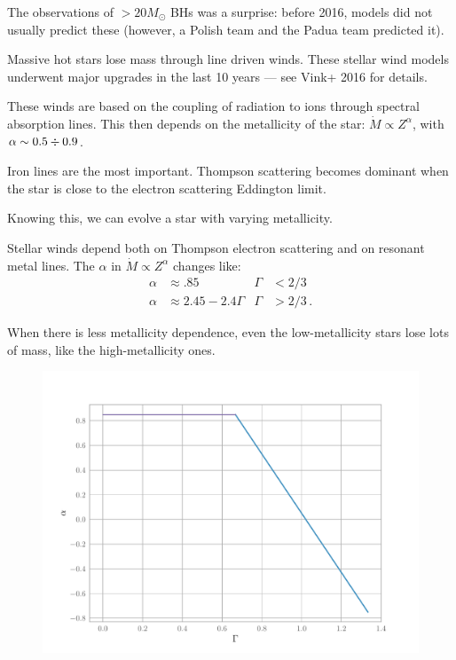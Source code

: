 \documentclass[main.tex]{subfiles}
\begin{document}
The observations of \(> 20 M_{\odot}\) BHs was a surprise: before 2016, models did not usually predict these (however, a Polish team and the Padua team predicted it).

Massive hot stars lose mass through line driven winds. 
These stellar wind models underwent major upgrades in the last 10 years --- see Vink+ 2016 for details. 

These winds are based on the coupling of radiation to ions through spectral absorption lines. This then depends on the metallicity of the star: \(\dot{M} \propto Z^{\alpha }\), with \(\alpha \sim \num{.5} \divisionsymbol \num{.9}\). 

Iron lines are the most important.
Thompson scattering becomes dominant when the star is close to the electron scattering Eddington limit. 

Knowing this, we can evolve a star with varying metallicity. 

Stellar winds depend both on Thompson electron scattering and on resonant metal lines. 
The \(\alpha \) in \(\dot{M} \propto Z^{\alpha }\) changes like: 
%
\begin{align}
\alpha &\approx \num{.85} & \Gamma &< 2/3  \\
\alpha &\approx 2.45 - 2.4\Gamma & \Gamma &>2/3
\,.
\end{align}

When there is less metallicity dependence, even the low-metallicity stars lose lots of mass, like the high-metallicity ones. 

\begin{figure}[ht]
\centering
\includegraphics[width=\textwidth]{figures/Eddington_alpha_dependence.pdf}
\caption{}
\label{fig:Eddington_alpha_dependence}
\end{figure}
  
\end{document}
